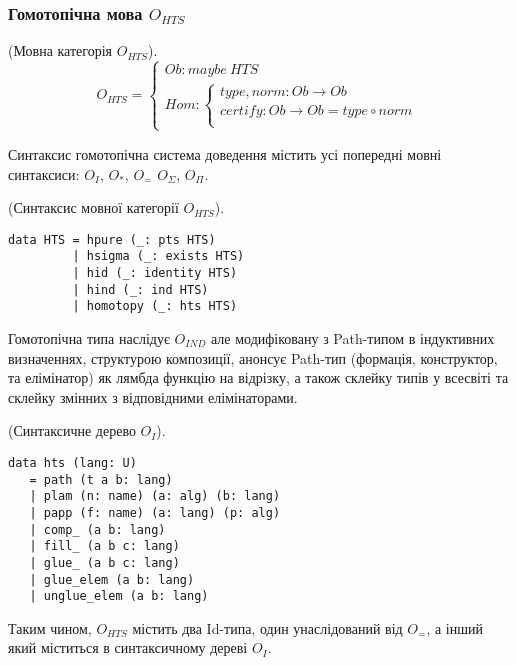 \begin{definition}
\begin{definition}
\begin{definition}
\begin{definition}
\newpage
\subsubsection{Гомотопічна мова $O_{HTS}$}

\begin{definition} (Мовна категорія $O_{HTS}$).
$$
O_{HTS} =
\begin{cases}
Ob: maybe\ HTS \\
Hom: \begin{cases}
type,norm: Ob \rightarrow Ob \\
certify: Ob \rightarrow Ob = type \circ norm \\
\end{cases}
\end{cases}
$$
\end{definition}

Синтаксис гомотопічна система доведення містить усі
попередні мовні синтаксиси: $O_I$, $O_*$, $O_=$ $O_\Sigma$, $O_\Pi$.

\begin{definition} (Синтаксис мовної категорії $O_{HTS}$).
\begin{lstlisting}
data HTS = hpure (_: pts HTS)
         | hsigma (_: exists HTS)
         | hid (_: identity HTS)
         | hind (_: ind HTS)
         | homotopy (_: hts HTS)
\end{lstlisting}
\end{definition}

Гомотопічна типа наслідує $O_{IND}$ але модифіковану з
Path-типом в індуктивних визначеннях, структурою композиції,
анонсує Path-тип (формація, конструктор, та елімінатор)
як лямбда функцію на відрізку, а також склейку типів у всесвіті
та склейку змінних з відповідними елімінаторами. 

\begin{definition} (Синтаксичне дерево $O_I$).
\begin{lstlisting}
data hts (lang: U)
   = path (t a b: lang)
   | plam (n: name) (a: alg) (b: lang)
   | papp (f: name) (a: lang) (p: alg)
   | comp_ (a b: lang)
   | fill_ (a b c: lang)
   | glue_ (a b c: lang)
   | glue_elem (a b: lang)
   | unglue_elem (a b: lang)
\end{lstlisting}
\end{definition}

Таким чином,
$O_{HTS}$ містить два Id-типа, один унаслідований від $O_=$,
а інший який міститься в синтаксичному дереві $O_I$.

\\


\end{definition}
\end{definition}
\end{definition}
\end{definition}
